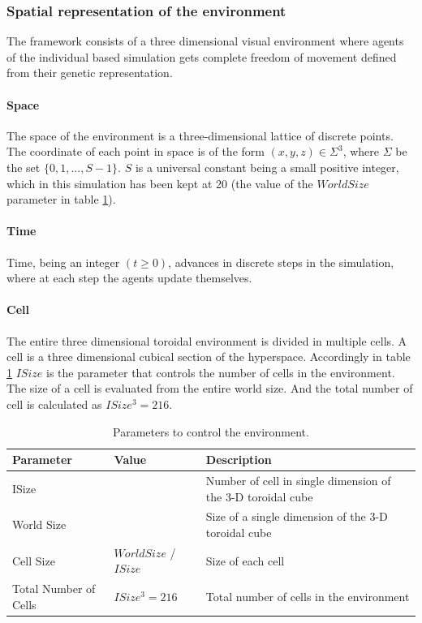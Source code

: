 \documentclass[letterpaper]{article}
\numberwithin{equation}{section}
\begin{document}
\subsubsection{Spatial representation of the environment}
The framework consists of a three dimensional visual environment where agents of the individual based simulation gets complete freedom of movement defined from their genetic representation. 

\paragraph{Space}
The space of the environment is a three-dimensional lattice of discrete points. The coordinate of each point in space is of the form \((x,y,z) \in \Sigma^3\), where \(\Sigma\) be the set \(\{0, 1, ..., S-1\}\). \(S\) is a universal constant being a small positive integer, which in this simulation has been kept at 20 (the value of the \(World Size\) parameter in table \ref{tab:environment-control-parameters}). 

\paragraph{Time}
Time, being an integer \( (t \geq 0) \), advances in discrete steps in the simulation, where at each step the agents update themselves. 

\paragraph{Cell}
The entire three dimensional toroidal environment is divided in multiple cells. A cell is a three dimensional cubical section of the hyperspace. Accordingly in table \ref{tab:environment-control-parameters} \(ISize\) is the parameter that controls the number of cells in the environment. The size of a cell is evaluated from the entire world size. And the total number of cell is calculated as \(ISize^3 = 216\).

\begin{table}[h]
\centering
\begin{tabular}{| p{1.5cm} | >{\centering} p{1.6cm} | p{4cm} |}
	\hline
		\textbf{Parameter} & \textbf{Value} & \textbf{Description} \\ \hline
		ISize & 6 & Number of cell in single dimension of the 3-D toroidal cube\\ \hline
		World Size & 20 & Size of a single dimension of the 3-D toroidal cube\\ \hline
		Cell Size & \( World Size\) / \(ISize \) & Size of each cell\\ \hline
		Total Number of Cells & \( ISize^3  = 216\) & Total number of cells in the environment\\ 
	\hline
\end{tabular}
\caption{Parameters to control the environment.}
\label{tab:environment-control-parameters}
\end{table}
\end{document}
